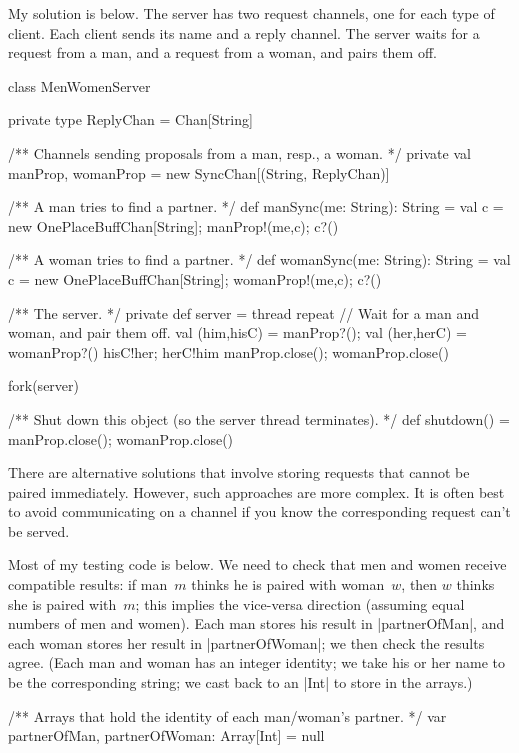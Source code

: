\begin{answerI}
My solution is below.  The server has two request channels, one for each type
of client.  Each client sends its name and a reply channel.  The server waits
for a request from a man, and a request from a woman, and pairs them off.
%
\begin{scala}
class MenWomenServer{
  private type ReplyChan = Chan[String]

  /** Channels sending proposals from a man, resp., a woman. */
  private val manProp, womanProp = new SyncChan[(String, ReplyChan)]

  /** A man tries to find a partner. */
  def manSync(me: String): String = {
    val c = new OnePlaceBuffChan[String]; manProp!(me,c); c?()
  }

  /** A woman tries to find a partner. */
  def womanSync(me: String): String = {
    val c = new OnePlaceBuffChan[String]; womanProp!(me,c); c?()
  }

  /** The server. */
  private def server = thread{
    repeat{
      // Wait for a man and woman, and pair them off. 
      val (him,hisC) = manProp?(); val (her,herC) = womanProp?()
      hisC!her; herC!him
    }
    manProp.close(); womanProp.close()
  }

  fork(server)

  /** Shut down this object (so the server thread terminates). */
  def shutdown() = { manProp.close(); womanProp.close() }
}
\end{scala}


There are alternative solutions that involve storing requests that cannot be
paired immediately.  However, such approaches are more complex.  It is often
best to avoid communicating on a channel if you know the corresponding request
can't be served.


Most of my testing code is below.  We need to check that men and women receive
compatible results: if man~$m$ thinks he is paired with woman~$w$, then $w$
thinks she is paired with~$m$; this implies the vice-versa direction (assuming
equal numbers of men and women).  Each man stores his result in
|partnerOfMan|, and each woman stores her result in |partnerOfWoman|; we then
check the results agree.  (Each man and woman has an integer identity; we take
his or her name to be the corresponding string; we cast back to an |Int| to
store in the arrays.)
%
\begin{scala}
  /** Arrays that hold the identity of each man/woman's partner. */
  var partnerOfMan, partnerOfWoman: Array[Int] = null


\end{scala}
\end{answerI}
